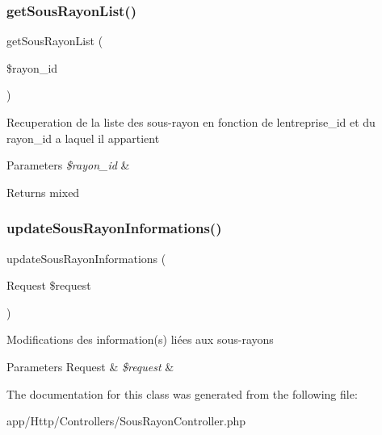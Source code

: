 \subsubsection{\texorpdfstring{get\+Sous\+Rayon\+List()}{getSousRayonList()}}
{\footnotesize\ttfamily get\+Sous\+Rayon\+List (\begin{DoxyParamCaption}\item[{}]{\$rayon\+\_\+id }\end{DoxyParamCaption})}

Recuperation de la liste des sous-\/rayon en fonction de l\textquotesingle{}entreprise\+\_\+id et du rayon\+\_\+id a laquel il appartient 
\begin{DoxyParams}{Parameters}
{\em \$rayon\+\_\+id} & \\
\hline
\end{DoxyParams}
\begin{DoxyReturn}{Returns}
mixed 
\end{DoxyReturn}
\mbox{\label{class_app_1_1_http_1_1_controllers_1_1_sous_rayon_controller_a4d332bfc1099e205f953a2a6bc8ad71e}} 
\subsubsection{\texorpdfstring{update\+Sous\+Rayon\+Informations()}{updateSousRayonInformations()}}
{\footnotesize\ttfamily update\+Sous\+Rayon\+Informations (\begin{DoxyParamCaption}\item[{Request}]{\$request }\end{DoxyParamCaption})}

Modifications des information(s) liées aux sous-\/rayons 
\begin{DoxyParams}[1]{Parameters}
Request & {\em \$request} & \\
\hline
\end{DoxyParams}


The documentation for this class was generated from the following file\+:\begin{DoxyCompactItemize}
\item 
app/\+Http/\+Controllers/Sous\+Rayon\+Controller.\+php\end{DoxyCompactItemize}

